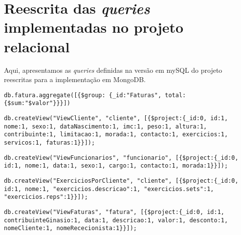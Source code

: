 \chapter{Reescrita das \emph{queries} implementadas no projeto relacional}

Aqui, apresentamos as \emph{queries} definidas na versão em mySQL do projeto reescritas para a implementação em MongoDB.

\begin{lstlisting}[caption=Calcular o total faturado]
    db.fatura.aggregate([{$group: {_id:"Faturas", total: {$sum:"$valor"}}}])
\end{lstlisting}

\begin{lstlisting}[caption=Listar todos os clientes do ginásio]
    db.createView("ViewCliente", "cliente", [{$project:{_id:0, id:1, nome:1, sexo:1, dataNascimento:1, imc:1, peso:1, altura:1, contribuinte:1, limitacao:1, morada:1, contacto:1, exercicios:1, servicos:1, faturas:1}}]);
\end{lstlisting}

\begin{lstlisting}[caption=Listar todos os funcionários]
    db.createView("ViewFuncionarios", "funcionario", [{$project:{_id:0, id:1, nome:1, data:1, sexo:1, cargo:1, contacto:1, morada:1}}]);
\end{lstlisting}

\begin{lstlisting}[caption=Listar todos os planos de exercícios de um cliente]
    db.createView("ExerciciosPorCliente", "cliente", [{$project:{_id:0, id:1, nome:1, "exercicios.descricao":1, "exercicios.sets":1, "exercicios.reps":1}}]);
\end{lstlisting}

\begin{lstlisting}[caption=Listar todas as faturas]
    db.createView("ViewFaturas", "fatura", [{$project:{_id:0, id:1, contribuinteGinasio:1, data:1, descricao:1, valor:1, desconto:1, nomeCliente:1, nomeRececionista:1}}]);
\end{lstlisting}

